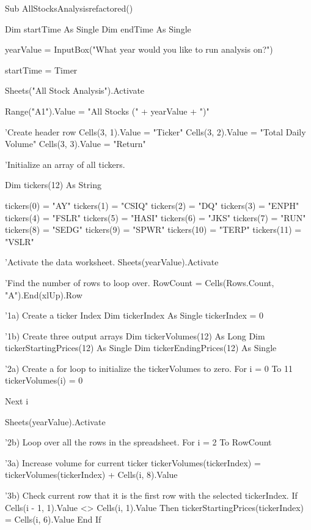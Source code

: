 Sub AllStocksAnalysisrefactored()

Dim startTime As Single
Dim endTime As Single


yearValue = InputBox("What year would you like to run analysis on?")

    startTime = Timer
    
    Sheets("All Stock Analysis").Activate

    Range("A1").Value = "All Stocks (" + yearValue + ")"
    
    'Create header row
    Cells(3, 1).Value = "Ticker"
    Cells(3, 2).Value = "Total Daily Volume"
    Cells(3, 3).Value = "Return"
    
'Initialize an array of all tickers.

    Dim tickers(12) As String
    
        tickers(0) = "AY"
        tickers(1) = "CSIQ"
        tickers(2) = "DQ"
        tickers(3) = "ENPH"
        tickers(4) = "FSLR"
        tickers(5) = "HASI"
        tickers(6) = "JKS"
        tickers(7) = "RUN"
        tickers(8) = "SEDG"
        tickers(9) = "SPWR"
        tickers(10) = "TERP"
        tickers(11) = "VSLR"

    
    'Activate the data worksheet.
    Sheets(yearValue).Activate
    
    
    'Find the number of rows to loop over.
    RowCount = Cells(Rows.Count, "A").End(xlUp).Row
    

    '1a) Create a ticker Index
    Dim tickerIndex As Single
    tickerIndex = 0
    
    '1b) Create three output arrays
    Dim tickerVolumes(12) As Long
    Dim tickerStartingPrices(12) As Single
    Dim tickerEndingPrices(12) As Single
    
    '2a) Create a for loop to initialize the tickerVolumes to zero.
    For i = 0 To 11
        tickerVolumes(i) = 0
        
    Next i
    
    Sheets(yearValue).Activate
    
    '2b) Loop over all the rows in the spreadsheet.
    For i = 2 To RowCount
    
        '3a) Increase volume for current ticker
      tickerVolumes(tickerIndex) = tickerVolumes(tickerIndex) + Cells(i, 8).Value
                
        '3b) Check current row that it is the first row with the selected tickerIndex.
            If Cells(i - 1, 1).Value <> Cells(i, 1).Value Then
                tickerStartingPrices(tickerIndex) = Cells(i, 6).Value
            End If
            
